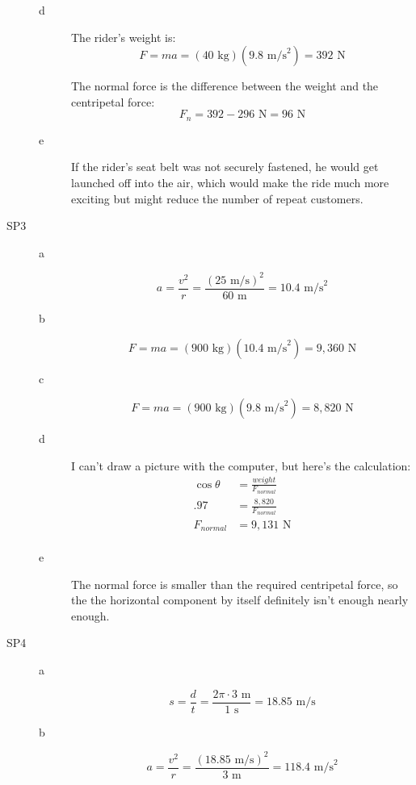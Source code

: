 \documentclass{exam}
\begin{document}
\begin{description}
\begin{description}
\item[d]
The rider's weight is:
\[
  F = ma = (40 \text{ kg})(9.8 \text{ m/s}^2) = 392 \text{ N}
\]

The normal force is the difference between the weight and the centripetal force:
\[
  F_n = 392 - 296 \text{ N} = 96 \text{ N}
\]

\item[e]
If the rider's seat belt was not securely fastened, he would get launched off into the air, which would make the ride
much more exciting but might reduce the number of repeat customers.

\end{description}

\item[SP3]
\begin{description}
\item[a]
\[
  a = \frac{v^2}{r} = \frac{(25 \text{ m/s})^2}{60 \text{ m}} = 10.4 \text{ m/s}^2
\]

\item[b]
\[
  F = ma = (900 \text{ kg})(10.4 \text{ m/s}^2) = 9,360 \text{ N}
\]

\item[c]
\[
  F = ma = (900 \text{ kg})(9.8 \text{ m/s}^2) = 8,820 \text{ N}
\]

\item[d]
I can't draw a picture with the computer, but here's the calculation:
\begin{align*}
  \cos \theta &= \frac{weight}{F_{normal}} \\
  .97 &= \frac{8,820}{F_{normal}} \\
  F_{normal} &= 9,131 \text{ N} \\
\end{align*}

\item[e]
The normal force is smaller than the required centripetal force, so the the horizontal component by itself definitely
isn't enough nearly enough. 

\end{description}

\item[SP4]
\begin{description}
\item[a]
\[
  s = \frac{d}{t} = \frac{2 \pi \cdot 3 \text{ m}}{1 \text{ s}} = 18.85 \text{ m/s}
\]

\item[b]
\[
  a = \frac{v^2}{r} = \frac{(18.85 \text{ m/s})^2}{3 \text{ m}} = 118.4 \text{ m/s}^2
\]


\end{description}
\end{description}
\end{document}
